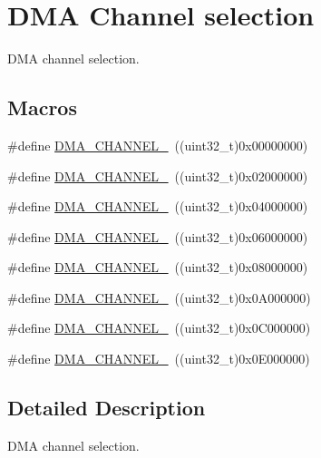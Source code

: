 \hypertarget{group___d_m_a___channel__selection}{}\section{D\+MA Channel selection}
\label{group___d_m_a___channel__selection}


D\+MA channel selection.  


\subsection*{Macros}
\begin{DoxyCompactItemize}
\item 
\#define \hyperlink{group___d_m_a___channel__selection_gabd7de138931e93a90fc6c4eab5916bbe}{D\+M\+A\+\_\+\+C\+H\+A\+N\+N\+E\+L\+\_}~((uint32\+\_\+t)0x00000000)
\item 
\#define \hyperlink{group___d_m_a___channel__selection_ga283364370e9876af6406b9fa70e2944f}{D\+M\+A\+\_\+\+C\+H\+A\+N\+N\+E\+L\+\_}~((uint32\+\_\+t)0x02000000)
\item 
\#define \hyperlink{group___d_m_a___channel__selection_ga9688f3e78cbc2109d214b7ca049e22df}{D\+M\+A\+\_\+\+C\+H\+A\+N\+N\+E\+L\+\_}~((uint32\+\_\+t)0x04000000)
\item 
\#define \hyperlink{group___d_m_a___channel__selection_gac689673fec4d72ede49a0d657e3a7e70}{D\+M\+A\+\_\+\+C\+H\+A\+N\+N\+E\+L\+\_}~((uint32\+\_\+t)0x06000000)
\item 
\#define \hyperlink{group___d_m_a___channel__selection_ga51b51f5b39e23b28ad99520ad5be596f}{D\+M\+A\+\_\+\+C\+H\+A\+N\+N\+E\+L\+\_}~((uint32\+\_\+t)0x08000000)
\item 
\#define \hyperlink{group___d_m_a___channel__selection_gafbaa82f3cff89858e50363c04ed0cca0}{D\+M\+A\+\_\+\+C\+H\+A\+N\+N\+E\+L\+\_}~((uint32\+\_\+t)0x0\+A000000)
\item 
\#define \hyperlink{group___d_m_a___channel__selection_gad23679661d8da3bc1aaacc62f99821f7}{D\+M\+A\+\_\+\+C\+H\+A\+N\+N\+E\+L\+\_}~((uint32\+\_\+t)0x0\+C000000)
\item 
\#define \hyperlink{group___d_m_a___channel__selection_ga77ff4e8675a3991feb20e385242f34ab}{D\+M\+A\+\_\+\+C\+H\+A\+N\+N\+E\+L\+\_}~((uint32\+\_\+t)0x0\+E000000)
\end{DoxyCompactItemize}


\subsection{Detailed Description}
D\+MA channel selection. 



